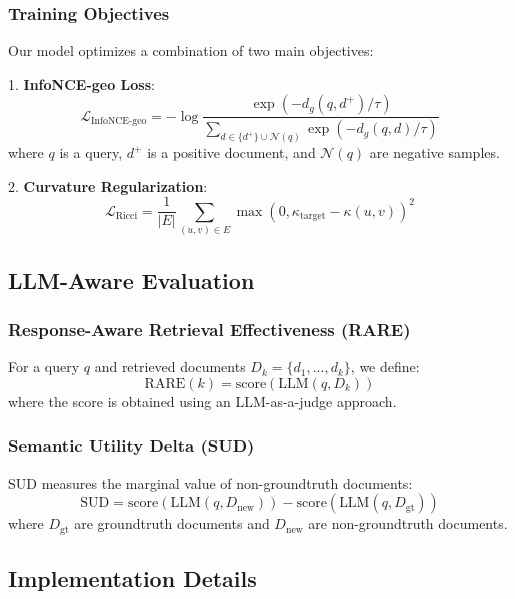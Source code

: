 \subsubsection{Training Objectives}
Our model optimizes a combination of two main objectives:

1. \textbf{InfoNCE-geo Loss}:
\begin{equation}
\mathcal{L}_{\text{InfoNCE-geo}} = -\log\frac{\exp(-d_g(q, d^+)/\tau)}{\sum_{d\in\{d^+\}\cup\mathcal{N}(q)} \exp(-d_g(q,d)/\tau)}
\end{equation}
where $q$ is a query, $d^+$ is a positive document, and $\mathcal{N}(q)$ are negative samples.

2. \textbf{Curvature Regularization}:
\begin{equation}
\mathcal{L}_{\text{Ricci}} = \frac{1}{|E|}\sum_{(u,v)\in E} \max(0, \kappa_{\text{target}} - \kappa(u,v))^2
\end{equation}

\subsection{LLM-Aware Evaluation}

\subsubsection{Response-Aware Retrieval Effectiveness (RARE)}
For a query $q$ and retrieved documents $D_k = \{d_1, ..., d_k\}$, we define:
\begin{equation}
\text{RARE}(k) = \text{score}(\text{LLM}(q, D_k))
\end{equation}
where the score is obtained using an LLM-as-a-judge approach.

\subsubsection{Semantic Utility Delta (SUD)}
SUD measures the marginal value of non-groundtruth documents:
\begin{equation}
\text{SUD} = \text{score}(\text{LLM}(q, D_{\text{new}})) - \text{score}(\text{LLM}(q, D_{\text{gt}}))
\end{equation}
where $D_{\text{gt}}$ are groundtruth documents and $D_{\text{new}}$ are non-groundtruth documents.

\subsection{Implementation Details}

